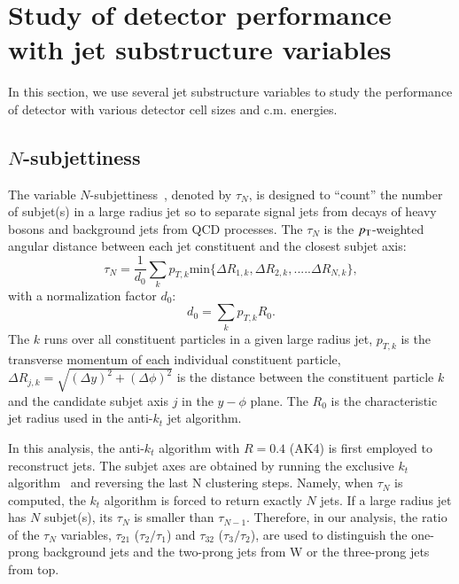 \section{Study of detector performance with jet substructure variables}
In this section, we use several jet substructure variables to study the performance of detector with various detector cell sizes and c.m. energies.

\subsection{$N$-subjettiness \label{sec:nsub}}
The variable $N$-subjettiness~\cite{Thaler:2010tr}, denoted by $\tau_N$, is designed to 
``count'' the number of subjet(s) in a large radius jet so to separate 
signal jets from decays of heavy bosons and background jets from QCD processes. 
The $\tau_N$ is the $p_{\mathrm{T}}$-weighted angular distance between each jet 
constituent and the closest subjet axis: 
\begin{equation}\label{eq:Nsub_1}
\tau_{N}=\frac{1}{d_{0}}\sum_{k}p_{T,k} \mathrm{min}\{\Delta R_{1,k},\Delta R_{2,k},.....\Delta R_{N,k}\},
\end{equation}
with a normalization factor $d_0$: \[d_{0}=\sum_{k}p_{T,k} R_{0}.\] 
The $k$ runs over all constituent particles in a given large radius jet, 
$p_{T,k}$ is the transverse momentum of each individual constituent particle, 
$\Delta R_{j,k}=\sqrt{(\Delta y)^{2}+(\Delta \phi)^{2}}$ is the distance 
between the constituent particle $k$ and the candidate subjet axis $j$ in the 
$y-\phi$ plane. The $R_{0}$ is the characteristic jet radius used in 
the anti-$k_t$ jet algorithm. 

In this analysis, the anti-$k_t$ algorithm with $R=0.4$ (AK4) is first 
employed to reconstruct jets. The subjet axes are obtained by running the 
exclusive $k_{t}$ algorithm~\cite{Catani:246812} and reversing the last N clustering steps. 
Namely, when $\tau_N$ is computed, the $k_{t}$ algorithm is forced to return 
exactly $N$ jets. If a large radius jet has $N$ subjet(s), its $\tau_{N}$ is 
smaller than $\tau_{N-1}$. Therefore, in our analysis, 
the ratio of the $\tau_{N}$ variables, 
$\tau_{21}$ ($\tau_{2}/\tau_{1}$) and $\tau_{32}$ ($\tau_{3}/\tau_{2}$),  
are used to distinguish the one-prong background jets and 
the two-prong jets from W or the three-prong jets from top. 

